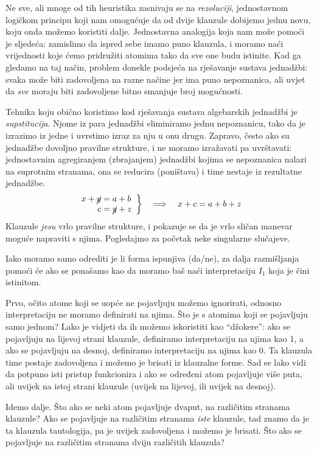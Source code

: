 Ne sve, ali mnoge od tih heuristika zasnivaju se na \emph{rezoluciji}, jednostavnom logičkom principu koji nam omogućuje da od dvije klauzule dobijemo jednu novu, koju onda možemo koristiti dalje. Jednostavna analogija koja nam može pomoći je sljedeća: zamislimo da ispred sebe imamo puno klauzula, i moramo naći vrijednosti koje ćemo pridružiti atomima tako da sve one budu istinite. Kad ga gledamo na taj način, problem donekle podsjeća na rješavanje sustava jednadžbi: svaka može biti zadovoljena na razne načine jer ima puno nepoznanica, ali uvjet da \emph{sve} moraju biti zadovoljene bitno smanjuje broj mogućnosti.

Tehnika koju obično koristimo kod rješavanja sustava algebarskih jednadžbi je \emph{supstitucija}. Njome iz para jednadžbi eliminiramo jednu nepoznanicu, tako da je izrazimo iz jedne i uvrstimo izraz za nju u onu drugu. Zapravo, često ako su jednadžbe dovoljno pravilne strukture, i ne moramo izražavati pa uvrštavati: jednostavnim agregiranjem (zbrajanjem) jednadžbi kojima se nepoznanica nalazi na suprotnim stranama, ona se reducira (po\-ni\-šta\-va) i time nestaje iz rezultatne jednadžbe.
$$\left.\begin{array}{r@{\;=\;}l}x+\cancel{y}&a+b\\c&\cancel{y}+z\end{array}\right\}\quad\Longrightarrow\quad x + c = a + b + z$$
Klauzule \emph{jesu} vrlo pravilne strukture, i pokazuje se da je vrlo sličan manevar moguće napraviti s njima. Pogledajmo za početak neke singularne slučajeve.

Iako moramo samo odrediti je li forma ispunjiva (da/ne), za dalja raz\-miš\-lja\-nja pomoći će ako se ponašamo kao da moramo baš naći interpretaciju $I_1$ koja je čini istinitom.

Prvo, očito atome koji se uopće ne pojavljuju možemo ignorirati, odnosno interpretaciju ne moramo definirati na njima. Što je s atomima koji se pojavljuju samo jednom? Lako je vidjeti da ih možemo iskoristiti kao ``džokere'': ako se pojavljuju na lijevoj strani klauzule, definiramo interpretaciju na njima kao $1$, a ako se pojavljuju na desnoj, definiramo interpretaciju na njima kao $0$. Ta klauzula time postaje zadovoljena i možemo je brisati iz klauzalne forme. Sad se lako vidi da potpuno isti pristup funkcionira i ako se određeni atom pojavljuje više puta, ali uvijek na istoj strani klauzule (uvijek na lijevoj, ili uvijek na desnoj).

Idemo dalje. Što ako se neki atom pojavljuje dvaput, na različitim stranama klauzule? Ako se pojavljuje na različitim stranama \emph{iste} klauzule, tad znamo da je ta klauzula tautologija, pa je uvijek zadovoljena i možemo je brisati. Što ako se pojavljuje na različitim stranama dviju različitih klauzula?

